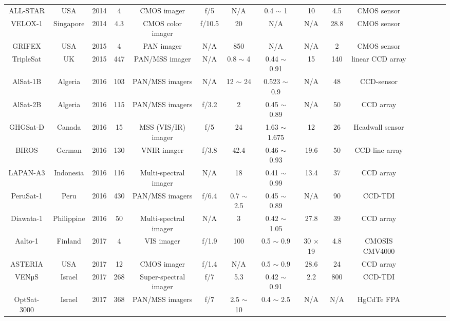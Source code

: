 \documentclass[final,5p,times,twocolumn,authoryear]{elsarticle}
\begin{document}
\begin{table}
{\begin{tabular}{c c c c c c c c c c c c c c c c}
		    ALL-STAR & USA & 2014 & 4 & CMOS imager & f/5 & N/A & 0.4 $\sim$ 1 &  10 & 4.5 &  CMOS sensor & \citep{eoportal}\\		 
		    VELOX-1 & Singapore & 2014 & 4.3 & CMOS color imager & f/10.5 & 20 & N/A & N/A & 28.8 &  CMOS sensor & \citep{bui2015system}\\		  
		    GRIFEX & USA & 2015 & 4 & PAN imager & N/A & 850 & N/A &  N/A & 2 &  CMOS sensor & \citep{eoportal}   \\
		    TripleSat & UK & 2015 & 447 & PAN/MSS imager & N/A & 0.8 $\sim$ 4 & 0.44 $\sim$ 0.91 & 15 & 140 & linear CCD array &\citep{eoportal}\\		     
		    AlSat-1B & Algeria & 2016 & 103 & PAN/MSS imagers & N/A & 12 $\sim$ 24 & 0.523 $\sim$ 0.9 &  N/A & 48 &  CCD-sensor & \citep{serief2017estimate}\\		      
		    AlSat-2B & Algeria & 2016 & 115 & PAN/MSS imagers & f/3.2 & 2 & 0.45 $\sim$ 0.89 &  N/A & 50 & CCD array & \citep{wahballah2020survey}\\	
		    GHGSat-D & Canada & 2016 & 15 & MSS (VIS/IR) imager & f/5 & 24 & 1.63 $\sim$ 1.675 &  12 & 26 & Headwall sensor & \citep{jervis2021ghgsat}\\	
		    BIROS & German & 2016 & 130 & VNIR imager & f/3.8 & 42.4 & 0.46 $\sim$ 0.93 & 19.6 & 50 & CCD-line array & \citep{lorenz2015remote} \\
		    LAPAN-A3 & Indonesia & 2016 & 116 & Multi-spectral imager & N/A & 18 & 0.41 $\sim$ 0.99 & 13.4 & 37 &  CCD array & \citep{khamsah2019development}\\		    
		    PeruSat-1 & Peru & 2016 & 430 & PAN/MSS imagers & f/6.4 & 0.7 $\sim$ 2.5 & 0.45 $\sim$ 0.89 &  N/A & 90 &  CCD-TDI & \citep{wahballah2020survey}\\	
		    Diawata-1 & Philippine & 2016 & 50 & Multi-spectral imager & N/A & 3 & 0.42 $\sim$ 1.05 &  27.8 & 39 & CCD array & \citep{eoportal}\\	
		    Aalto-1 & Finland & 2017 & 4 & VIS imager & f/1.9 & 100 & 0.5 $\sim$ 0.9 &  30 $\times$ 19 & 4.8 &  CMOSIS CMV4000 & \citep{mughal2021aalto}\\		
		    ASTERIA & USA & 2017 & 12 & CMOS imager & f/1.4 & N/A & 0.5 $\sim$ 0.9 & 28.6 & 24 &  CCD array & \citep{eoportal}\\		    
 		   VENµS & Israel & 2017 & 268 & Super-spectral imager & f/7 & 5.3 & 0.42 $\sim$ 0.91 &  2.2 & 800 &  CCD-TDI & \citep{eoportal}\\	
		    OptSat-3000 & Israel & 2017 & 368 & PAN/MSS imagers & f/7 & 2.5 $\sim$ 10 & 0.4 $\sim$ 2.5 & N/A & N/A &  HgCdTe FPA & \citep{qian2015optical}\\ 		

\end{tabular}}
\end{table}
\end{document}
